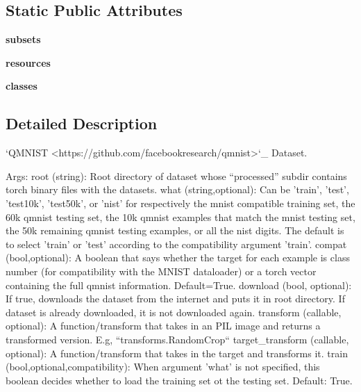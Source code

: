 \subsection*{Static Public Attributes}
\begin{DoxyCompactItemize}
\item 
\mbox{\label{classtorchvision_1_1datasets_1_1mnist_1_1QMNIST_af01e5797274dd58d9dd540bce20d2f6f}} 
{\bfseries subsets}
\item 
\mbox{\label{classtorchvision_1_1datasets_1_1mnist_1_1QMNIST_ad6aa269d358ba6ce5041b574c9082971}} 
{\bfseries resources}
\item 
\mbox{\label{classtorchvision_1_1datasets_1_1mnist_1_1QMNIST_a88949a24021ba240870588f382b3e399}} 
{\bfseries classes}
\end{DoxyCompactItemize}


\subsection{Detailed Description}
\begin{DoxyVerb}`QMNIST <https://github.com/facebookresearch/qmnist>`_ Dataset.

Args:
    root (string): Root directory of dataset whose ``processed''
        subdir contains torch binary files with the datasets.
    what (string,optional): Can be 'train', 'test', 'test10k',
        'test50k', or 'nist' for respectively the mnist compatible
        training set, the 60k qmnist testing set, the 10k qmnist
        examples that match the mnist testing set, the 50k
        remaining qmnist testing examples, or all the nist
        digits. The default is to select 'train' or 'test'
        according to the compatibility argument 'train'.
    compat (bool,optional): A boolean that says whether the target
        for each example is class number (for compatibility with
        the MNIST dataloader) or a torch vector containing the
        full qmnist information. Default=True.
    download (bool, optional): If true, downloads the dataset from
        the internet and puts it in root directory. If dataset is
        already downloaded, it is not downloaded again.
    transform (callable, optional): A function/transform that
        takes in an PIL image and returns a transformed
        version. E.g, ``transforms.RandomCrop``
    target_transform (callable, optional): A function/transform
        that takes in the target and transforms it.
    train (bool,optional,compatibility): When argument 'what' is
        not specified, this boolean decides whether to load the
        training set ot the testing set.  Default: True.\end{DoxyVerb}
 

